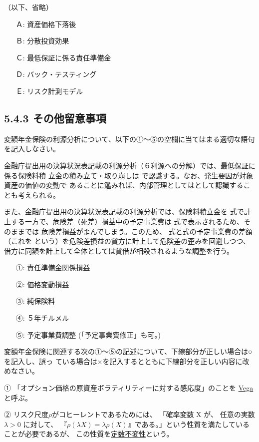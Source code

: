 \documentclass[report,gutter=10mm,fore-edge=10mm,uplatex,dvipdfmx]{jlreq}
\begin{document}
（以下、省略）
\answer{}
\begin{itemize}
 \item[Ａ: ] 資産価格下落後
 \item[Ｂ: ] 分散投資効果
 \item[Ｃ: ] 最低保証に係る責任準備金
 \item[Ｄ: ] バック・テスティング
 \item[Ｅ: ] リスク計測モデル
\end{itemize}
\subsection{5.4.3 その他留意事項}
変額年金保険の利源分析について、以下の①～⑤の空欄に当てはまる適切な語句を記入しなさい。

金融庁提出用の決算状況表記載の利源分析（６利源への分解）では、最低保証に係る保険料積
立金の積み立て・取り崩しは
で認識する。なお、発生要因が対象資産の価値の変動で
あることに鑑みれば、内部管理としてはとして認識することも考えられる。

また、金融庁提出用の決算状況表記載の利源分析では、保険料積立金を
式で計上する一方で、危険差（死差）損益中の予定事業費は
式で表示されるため、そのままでは
危険差損益が歪んでしまう。このため、
式と式の予定事業費の差額（これを
という）を危険差損益の貸方に計上して危険差の歪みを回避しつつ、
借方に同額を計上して全体としては貸借が相殺されるような調整を行う。

\answer{}
\begin{itemize}
\item[ ①: ] 責任準備金関係損益
\item[ ②: ] 価格変動損益
\item[ ③: ] 純保険料
\item[ ④: ] ５年チルメル
\item[ ⑤: ] 予定事業費調整 (「予定事業費修正」も可。)
\end{itemize}

変額年金保険に関連する次の①～⑤の記述について、下線部分が正しい場合は○を記入し、誤っ
ている場合は×を記入するとともに下線部分を正しい内容に改めなさい。

① 「オプション価格の原資産ボラティリティーに対する感応度」のことを \underline{Vega} と呼ぶ。

② リスク尺度$\rho$がコヒーレントであるためには、
「確率変数 X が、
任意の実数$\lambda>0$ に対して、
『$\rho(\lambda X)=\lambda\rho(X)$』である。」という性質を満たしていることが必要であるが、
この性質を\underline{定数不変性}という。
\end{document}
